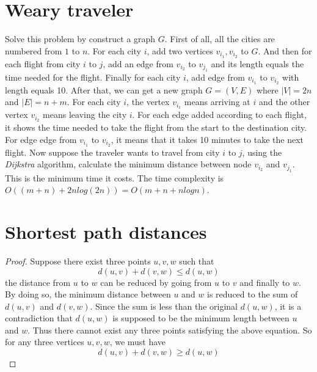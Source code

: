\documentclass{article}
\begin{document}
	\section{Weary traveler}
		Solve this problem by construct a graph $G$. First of all, all the cities are numbered from $1$ to $n$. For each city $i$, add two vertices $v_{i_1}, v_{i_2}$ to $G$. And then for each flight from city $i$ to $j$, add an edge from $v_{i_2}$ to $v_{j_1}$ and its length equals the time needed for the flight. Finally for each city $i$, add edge from $v_{i_1}$ to $v_{i_2}$ with length equals 10. After that, we can get a new graph $G = (V, E)$ where $|V| = 2n$ and $|E| = n + m$. For each city $i$, the vertex $v_{i_1}$ means arriving at $i$ and the other vertex $v_{i_2}$ means leaving the city $i$. For each edge added according to each flight, it shows the time needed to take the flight from the start to the destination city. For edge edge from $v_{i_1}$ to $v_{i_2}$, it means that it takes 10 minutes to take the next flight. \newline
		Now suppose the traveler wants to travel from city $i$ to $j$, using the \emph{Dijkstra} algorithm, calculate the minimum distance between node $v_{i_2}$ and $v_{j_1}$. This is the minimum time it costs. \newline
		The time complexity is $O((m + n) + 2n log(2n)) = O(m + n + nlogn)$.

	\section{Shortest path distances}
		\begin{proof}
			Suppose there exist three points $u, v, w$ such that \begin{displaymath}
				d(u, v) + d(v, w) \le d(u, w)
			\end{displaymath}
			the distance from $u$ to $w$ can be reduced by going from $u$ to $v$ and finally to $w$. By doing so, the minimum distance between $u$ and $w$ is reduced to the sum of $d(u, v)$ and $d(v, w)$. Since the sum is less than the original $d(u, w)$, it is a contradiction that $d(u, w)$ is supposed to be the minimum length between $u$ and $w$. Thus there cannot exist any three points satisfying the above equation. So for any three vertices $u, v, w$, we must have\begin{displaymath}
				d(u, v) + d(v, w) \geq d(u, w)
			\end{displaymath}
		\end{proof}
\end{document}
